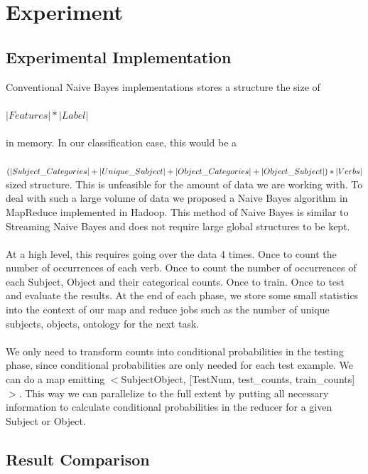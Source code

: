 \section{Experiment}

\subsection{Experimental Implementation}

Conventional Naive Bayes implementations stores a structure the size of \\
\\
$|Features| * |Label|$ \\
\\
in memory. In our classification case, this would be a \\
\\
$(|Subject\_Categories|+|Unique\_Subject|\\+|Object\_Categories|+|Object\_Subject|) * |Verbs|$ \\

sized structure. This is unfeasible for the amount of data we are working with. To deal with such a large volume of data we proposed a Naive Bayes algorithm in MapReduce implemented in Hadoop. This method of Naive Bayes is similar to Streaming Naive Bayes and does not require large global structures to be kept.\\
\\
At a high level, this requires going over the data 4 times. Once to count the number of occurrences of each verb. Once to count the number of occurrences of each Subject, Object and their categorical counts. Once to train. Once to test and evaluate the results. At the end of each phase, we store some small statistics into the context of our map and reduce jobs such as the number of unique subjects, objects, ontology for the next task.\\
\\
We only need to transform counts into conditional probabilities in the testing phase, since conditional probabilities are only needed for each test example. We can do a map emitting $<$Subject\/Object, [TestNum, test\_counts, train\_counts]$>$. This way we can parallelize to the full extent by putting all necessary information to calculate conditional probabilities in the reducer for a given Subject or Object. 

\subsection{Result Comparison}

